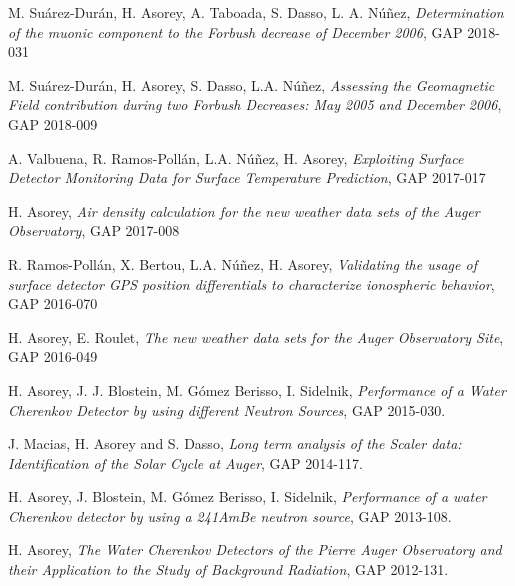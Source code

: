 \noindent
\begin{etaremune}

\item {} M. Suárez-Durán, H. Asorey, A. Taboada, S. Dasso, L. A. Núñez, {\emph{Determination of the muonic component to the Forbush decrease of December 2006}}, GAP 2018-031

\item {} M. Suárez-Durán, H. Asorey, S. Dasso, L.A. Núñez, {\emph{Assessing the Geomagnetic Field contribution during two Forbush Decreases: May 2005 and December 2006}}, GAP 2018-009

\item {} A. Valbuena, R. Ramos-Pollán, L.A. Núñez, H. Asorey, {\emph{Exploiting Surface Detector Monitoring Data for Surface Temperature Prediction}}, GAP 2017-017

\item {} H. Asorey, {\emph{Air density calculation for the new weather data sets of the Auger Observatory}}, GAP 2017-008

\item {} R. Ramos-Pollán, X. Bertou, L.A. Núñez, H. Asorey, {\emph{Validating the usage of surface detector GPS position differentials to characterize ionospheric behavior}}, GAP 2016-070

\item {} H. Asorey, E. Roulet, {\emph{The new weather data sets for the Auger Observatory Site}}, GAP 2016-049

\item {} H. Asorey, J. J. Blostein, M. Gómez Berisso, I. Sidelnik, {\emph{Performance of a Water Cherenkov Detector by using different Neutron Sources}}, GAP 2015-030.

\item {} J. Macias, H. Asorey and S. Dasso, {\emph{Long term analysis of the Scaler data: Identification of the Solar Cycle at Auger}}, GAP 2014-117.

\item {} H. Asorey, J. Blostein, M. Gómez Berisso, I. Sidelnik, {\emph{Performance of a water Cherenkov detector by using a 241AmBe neutron source}}, GAP 2013-108.

\item {} H. Asorey, {\emph{The Water Cherenkov Detectors of the Pierre Auger Observatory and their Application to the Study of Background Radiation}}, GAP 2012-131.


\end{etaremune}
